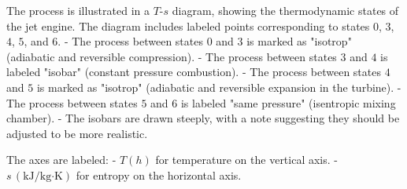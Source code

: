 The process is illustrated in a \( T \)-\( s \) diagram, showing the thermodynamic states of the jet engine. The diagram includes labeled points corresponding to states \( 0 \), \( 3 \), \( 4 \), \( 5 \), and \( 6 \).  
- The process between states \( 0 \) and \( 3 \) is marked as "isotrop" (adiabatic and reversible compression).  
- The process between states \( 3 \) and \( 4 \) is labeled "isobar" (constant pressure combustion).  
- The process between states \( 4 \) and \( 5 \) is marked as "isotrop" (adiabatic and reversible expansion in the turbine).  
- The process between states \( 5 \) and \( 6 \) is labeled "same pressure" (isentropic mixing chamber).  
- The isobars are drawn steeply, with a note suggesting they should be adjusted to be more realistic.  

The axes are labeled:  
- \( T(h) \) for temperature on the vertical axis.  
- \( s \, (\text{kJ}/\text{kg·K}) \) for entropy on the horizontal axis.